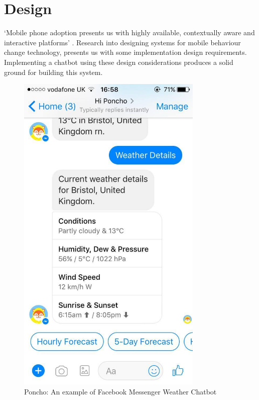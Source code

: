 
\newpage
\section{Design}
`Mobile phone adoption presents us with highly available, contextually aware and interactive platforms' \cite{article_mhealth}. Research into designing systems for mobile behaviour change technology, presents us with some implementation design requirements. Implementing a chatbot using these design considerations produces a solid ground for building this system.\newline
\newline

\begin{figure}[ht] %
    \centering
    \includegraphics[width=3.5in]{../resources/poncho.jpg}
    \caption{Poncho: An example of Facebook Messenger Weather Chatbot}
    \label{fig:poncho}
\end{figure}

\newpage

